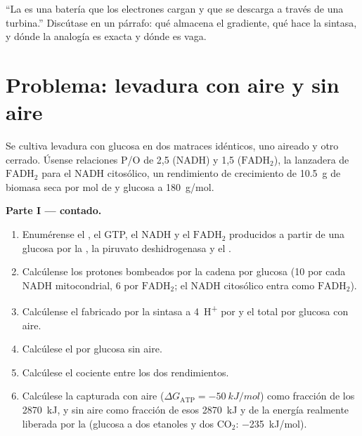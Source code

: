 \begin{exercise}[$\star\star\star$]\label{exo:b1:respiration-fermentation:12}
``La  es una batería que los electrones cargan y que se descarga
a través de una turbina.'' Discútase en un párrafo: qué almacena el
gradiente, qué hace la sintasa, y dónde la analogía es exacta y dónde es
vaga.
\end{exercise}

\section{Problema: levadura con aire y sin aire}

\begin{problem}
\label{pb:b1:respiration-fermentation:1}
Se cultiva levadura con glucosa en dos matraces idénticos, uno aireado y
otro cerrado. Úsense relaciones P/O de 2,5 (NADH) y 1,5
($\mathrm{FADH_2}$), la lanzadera de $\mathrm{FADH_2}$ para el NADH
citosólico, un rendimiento de crecimiento de \qty{10.5}{g} de biomasa seca
por mol de  y glucosa a \qty{180}{g/mol}.

\medskip
\noindent\textbf{Parte I ---  contado.}
\begin{enumerate}
  \item Enumérense el , el GTP, el NADH y el $\mathrm{FADH_2}$
        producidos a partir de una glucosa por la , la piruvato
        deshidrogenasa y el .
  \item Calcúlense los protones bombeados por la cadena por glucosa (10 por
        cada NADH mitocondrial, 6 por $\mathrm{FADH_2}$; el NADH citosólico
        entra como $\mathrm{FADH_2}$).
  \item Calcúlense el  fabricado por la sintasa a \qty{4}{H^+} por  y
        el  total por glucosa con aire.
  \item Calcúlese el  por glucosa sin aire.
  \item Calcúlese el cociente entre los dos rendimientos.
  \item Calcúlese la  capturada con aire
        ($\Delta G_{\text{ATP}}
        = \qty{-50}{kJ/mol}$) como fracción de los
        \qty{2870}{kJ}, y sin aire como fracción de esos \qty{2870}{kJ} y
        de la energía realmente liberada por la  (glucosa a dos
        etanoles y dos $\mathrm{CO_2}$: \qty{-235}{kJ/mol}).
\end{enumerate}


\end{problem}
